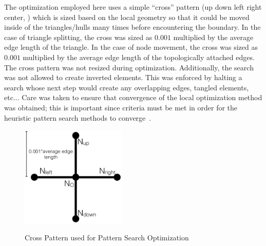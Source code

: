 The optimization employed here uses a simple ``cross'' pattern (up down
left right center, ) which is sized based on the
local geometry so that it could be moved inside of the triangles/hulls
many times before encountering the boundary. In the case of triangle
splitting, the cross was sized as $0.001$ multiplied by the average edge
length of the triangle. In the case of node movement, the cross was
sized as $0.001$ multiplied by the average edge length of the
topologically attached edges. The cross pattern was not resized during
optimization.  Additionally, the search was not allowed to create
inverted elements.  This was enforced by halting a search whose next
step would create any overlapping edges, tangled elements, etc... Care
was taken to ensure that convergence of the local optimization method
was obtained; this is important since criteria must be met in order for
the heuristic pattern search methods to
converge~\cite{patternsearch2,patternsearch3}.

\begin{figure}
  \begin{center}
  \label{crossPattern}
  \includegraphics[width=50mm]{Figures/crossPattern.png}
  \caption{Cross Pattern used for Pattern Search Optimization}
  \end{center}
\end{figure}
